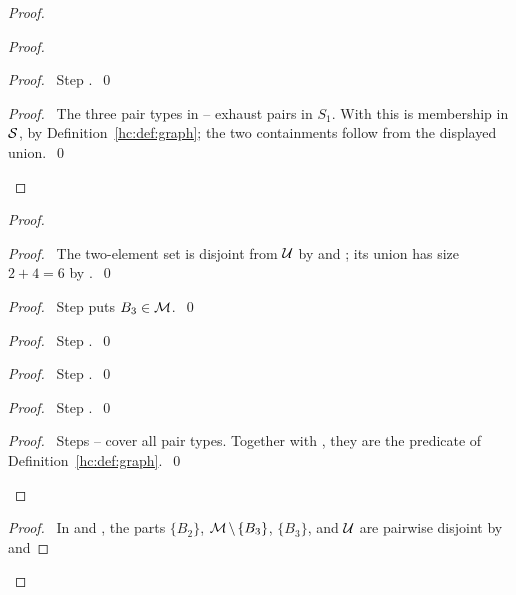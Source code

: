 \begin{mergedproofsection}
\begin{proof}
\begin{proof}
  \begin{proof}\pf\ Step .~\qed\end{proof}
  \qedstep
  \begin{proof}\pf\ The three pair types in
   -- exhaust
   pairs in $S_1$. With  this is membership
   in ${\mathcal S}$, by Definition~\ref{hc:def:graph}; the two containments
   follow from the displayed union.~\qed\end{proof}
 \end{proof}
 \begin{proof}
  \begin{proof}\pf\ The two-element set is disjoint from ${\mathcal U}$
   by  and ; its
   union has size $2+4=6$ by .~\qed\end{proof}
  \begin{proof}\pf\ Step  puts $B_3\in{\mathcal M}$.~\qed\end{proof}
  \begin{proof}\pf\ Step .~\qed\end{proof}
  \begin{proof}\pf\ Step .~\qed\end{proof}
  \begin{proof}\pf\ Step .~\qed\end{proof}
  \qedstep
  \begin{proof}\pf\ Steps --
   cover all pair types. Together with ,
   they are the predicate of Definition~\ref{hc:def:graph}.~\qed\end{proof}
 \end{proof}
 \begin{proof}\pf\ In  and ,
  the parts $\{B_2\}$, ${\mathcal M}\mathbin{\mkern-1.5mu\setminus\mkern-1.5mu}\{B_3\}$, $\{B_3\}$, and
  ${\mathcal U}$ are pairwise disjoint by  and

\end{proof}
\end{proof}
\end{mergedproofsection}
